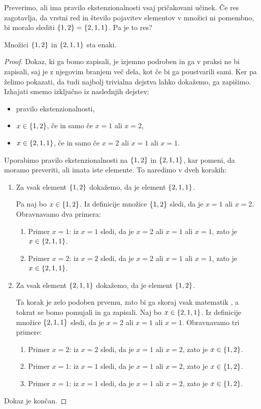 Preverimo, ali ima pravilo ekstenzionalnosti vsaj pričakovani učinek.
%
Če res zagotavlja, da vrstni red in število pojavitev elementov v množici ni pomembno, bi moralo slediti
$\left\{1, 2\right\} = \left\{2, 1, 1\right\}$. Pa je to res?

\begin{trditev}
  Množici $\left\{1, 2\right\}$ in $\left\{2, 1, 1\right\}$ sta enaki.
\end{trditev}

\begin{proof}
  Dokaz, ki ga bomo zapisali, je izjemno podroben in ga v praksi ne bi zapisali,
  saj je z njegovim branjem več dela, kot če bi ga poustvarili sami. Ker pa želimo pokazati, da
  tudi najbolj trivialna dejstva lahko dokažemo, ga zapišimo.
  Izhajati smemo izključno iz naslednjih dejstev:
  \begin{itemize}
  \item pravilo ekstenzionalnosti,
  \item $x \in \left\{1, 2\right\}$, če in samo če $x = 1$ ali $x = 2$,
  \item $x \in \left\{2, 1, 1\right\}$, če in samo če $x = 2$ ali $x = 1$ ali $x = 1$.
  \end{itemize}
  Uporabimo pravilo ekstenzionalnosti na $\left\{1, 2\right\}$ in
  $\left\{2, 1, 1\right\}$, kar pomeni, da moramo preveriti, ali imata iste elemente. To
  naredimo v dveh korakih:
  \begin{enumerate}
  \item Za vsak element $\left\{1, 2\right\}$ dokažemo, da je element $\left\{2, 1, 1\right\}$.

    Pa naj bo $x \in \left\{1, 2\right\}$. Iz definicije množice $\left\{1, 2\right\}$
    sledi, da je $x = 1$ ali $x = 2$. Obravnavamo dva primera:
    \begin{enumerate}
    \item Primer $x = 1$: iz $x = 1$ sledi, da je $x = 2$ ali $x = 1$ ali $x = 1$, zato je $x \in \left\{2, 1, 1\right\}$.
    \item Primer $x = 2$: iz $x = 2$ sledi, da je $x = 2$ ali $x = 1$ ali $x = 1$, zato je $x \in \left\{2, 1, 1\right\}$.
    \end{enumerate}
  \item Za vsak element $\left\{2, 1, 1\right\}$ dokažemo, da je element $\left\{1, 2\right\}$.

    Ta korak je zelo podoben prvemu, zato bi ga skoraj vsak matematik ,
    a tokrat se bomo pomujali in ga zapisali.
    Naj bo $x \in \left\{2, 1, 1\right\}$. Iz definicije množice $\left\{2, 1, 1\right\}$ sledi, da je $x = 2$ ali
    $x = 1$ ali $x = 1$. Obravnavamo tri primere:
    \begin{enumerate}
    \item Primer $x = 2$: iz $x = 2$ sledi, da je $x = 1$ ali $x = 2$, zato je $x \in \left\{1, 2\right\}$.
    \item Primer $x = 1$: iz $x = 1$ sledi, da je $x = 1$ ali $x = 2$, zato je $x \in \left\{1, 2\right\}$.
    \item Primer $x = 1$: iz $x = 1$ sledi, da je $x = 1$ ali $x = 2$, zato je $x \in \left\{1, 2\right\}$.
    \end{enumerate}
  \end{enumerate}
  Dokaz je končan.
\end{proof}


